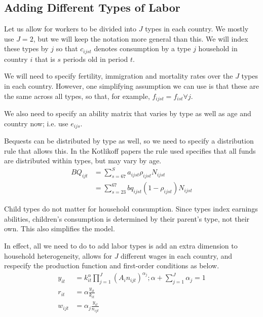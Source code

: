 \documentclass[letterpaper,12pt]{article}
\theoremstyle{definition}
\numberwithin{equation}{section}
\begin{document}
\begin{spacing}{1.5}
\newpage
\section{Adding Different Types of Labor}
	Let us allow for workers to be divided into $J$ types in each country.  We mostly use $J=2$, but we will keep the notation more general than this.  We will index these types by $j$ so that $c_{ijst}$ denotes consumption by a type $j$ household in country $i$ that is $s$ periods old in period $t$.

	We will need to specify fertility, immigration and mortality rates over the $J$ types in each country.  However, one simplifying assumption we can use is that these are the same across all types, so that, for example, $f_{ijst} = f_{ist} \forall j$.

	We also need to specify an ability matrix that varies by type as well as age and country now; i.e. use $e_{ijs}$.

	Bequests can be distributed by type as well, so we need to specify a distribution rule that allows this.  In the Kotlikoff papers the rule used specifies that all funds are distributed within types, but may vary by age.
	\begin{align}
		BQ_{ijt} & = \sum_{s=67}^S a_{ijst} \rho_{ijst} N_{ijst} \\
		& = \sum_{s=23}^{67} bq_{ijst} (1-\rho_{ijst}) N_{ijst}
	\end{align}

	Child types do not matter for household consumption.  Since types index earnings abilities, children's consumption is determined by their parent's type, not their own.  This also simplifies the model.

	In effect, all we need to do to add labor types is add an extra dimension to household heterogeneity, allows for $J$ different wages in each country, and respecify the production function and first-order conditions as below.
	\begin{align}
		y_{it} & = k_{it}^\alpha \prod_{j=1}^J \left( A_{i} n_{ijt} \right)^{\alpha_j}; \alpha + \sum_{j=1}^J \alpha_j = 1 \\
		r_{it} & = \alpha \frac{y_{it}}{k_{it}} \\
		w_{ijt} & = \alpha_j \frac{y_{it}}{n_{ijt}}
	\end{align}


\end{spacing}
\end{document}
